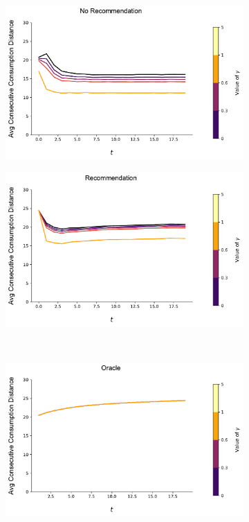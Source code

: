 \documentclass[format=acmsmall, review=true]{acmart}
\begin{document}
\begin{figure}[H]
\begin{subfigure}{.45\textwidth}
\includegraphics[width=\linewidth]{figures/gamma_consumption_dist_N_100T_20.pdf}
\end{subfigure}
\begin{subfigure}{.45\textwidth}
\includegraphics[width=\linewidth]{figures/gamma_consumption_dist_N_100T_20_partial.pdf}
\end{subfigure}\\
\begin{subfigure}{.45\textwidth}
\includegraphics[width=\linewidth]{figures/gamma_consumption_dist_N_100T_20_omni.pdf}\\

\end{subfigure}
\end{figure}
\end{document}
